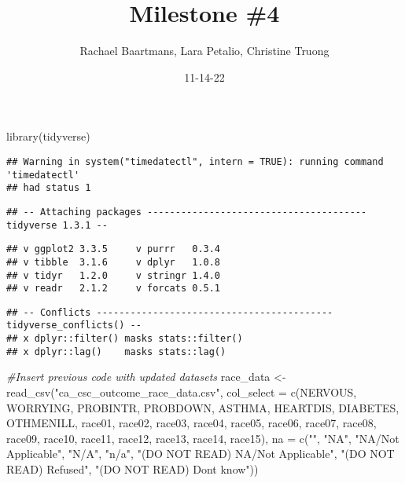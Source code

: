 \documentclass[
]{article}
\title{Milestone \#4}
\author{Rachael Baartmans, Lara Petalio, Christine Truong}
\date{11-14-22}
\newenvironment{Shaded}{\begin{snugshade}}{\end{snugshade}}
\newcommand{\AttributeTok}[1]{\textcolor[rgb]{0.77,0.63,0.00}{#1}}
\newcommand{\CommentTok}[1]{\textcolor[rgb]{0.56,0.35,0.01}{\textit{#1}}}
\newcommand{\FunctionTok}[1]{\textcolor[rgb]{0.00,0.00,0.00}{#1}}
\newcommand{\NormalTok}[1]{#1}
\newcommand{\OtherTok}[1]{\textcolor[rgb]{0.56,0.35,0.01}{#1}}
\newcommand{\StringTok}[1]{\textcolor[rgb]{0.31,0.60,0.02}{#1}}
\begin{document}
\maketitle

\begin{Shaded}
\begin{Highlighting}[]
\FunctionTok{library}\NormalTok{(tidyverse)}
\end{Highlighting}
\end{Shaded}

\begin{verbatim}
## Warning in system("timedatectl", intern = TRUE): running command 'timedatectl'
## had status 1
\end{verbatim}

\begin{verbatim}
## -- Attaching packages --------------------------------------- tidyverse 1.3.1 --
\end{verbatim}

\begin{verbatim}
## v ggplot2 3.3.5     v purrr   0.3.4
## v tibble  3.1.6     v dplyr   1.0.8
## v tidyr   1.2.0     v stringr 1.4.0
## v readr   2.1.2     v forcats 0.5.1
\end{verbatim}

\begin{verbatim}
## -- Conflicts ------------------------------------------ tidyverse_conflicts() --
## x dplyr::filter() masks stats::filter()
## x dplyr::lag()    masks stats::lag()
\end{verbatim}

\begin{Shaded}
\begin{Highlighting}[]
\CommentTok{\#Insert previous code with updated datasets }
\NormalTok{race\_data }\OtherTok{\textless{}{-}}\FunctionTok{read\_csv}\NormalTok{(}\StringTok{"ca\_csc\_outcome\_race\_data.csv"}\NormalTok{,}
            \AttributeTok{col\_select =} \FunctionTok{c}\NormalTok{(NERVOUS, WORRYING, PROBINTR,}
\NormalTok{                           PROBDOWN, ASTHMA, HEARTDIS,}
\NormalTok{                           DIABETES, OTHMENILL, race01, race02, race03,}
\NormalTok{                           race04, race05, race06, race07, race08,}
\NormalTok{                           race09, race10, race11, race12, race13,}
\NormalTok{                           race14, race15),}
            \AttributeTok{na =} \FunctionTok{c}\NormalTok{(}\StringTok{""}\NormalTok{, }\StringTok{"NA"}\NormalTok{, }\StringTok{"NA/Not Applicable"}\NormalTok{, }\StringTok{"N/A"}\NormalTok{, }\StringTok{"n/a"}\NormalTok{,}
                   \StringTok{"(DO NOT READ) NA/Not Applicable"}\NormalTok{,}
                   \StringTok{"(DO NOT READ) Refused"}\NormalTok{,}
                   \StringTok{"(DO NOT READ) Don\textquotesingle{}t know"}\NormalTok{))}
\end{Highlighting}
\end{Shaded}
\end{document}
